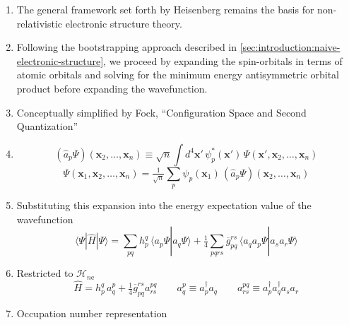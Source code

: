 \begin{enumerate}
    \item
        The general framework set forth by Heisenberg remains the basis for
        non-relativistic electronic structure theory.
    \item
        Following the bootstrapping approach described in
        \cref{sec:introduction:naive-electronic-structure}, we proceed by
        expanding the spin-orbitals in terms of atomic orbitals and solving for
        the minimum energy antisymmetric orbital product before expanding the
        wavefunction.
    \item
        Conceptually simplified by Fock, ``Configuration Space and Second
        Quantization''\cite{Fock:1932p622}
    \item
        \begin{equation}
            (\hat{a}_p\Psi)(\mathbf{x}_2, \ldots, \mathbf{x}_n)
            \equiv
            \sqrt{n}
            \int
            d^4\mathbf{x}'\,
            \psi_p^*(\mathbf{x}')\,
            \Psi(\mathbf{x}', \mathbf{x}_2, \ldots, \mathbf{x}_n)
        \end{equation}
        \begin{equation}
            \Psi(\mathbf{x}_1, \mathbf{x}_2, \ldots, \mathbf{x}_n)
            =
            \tfrac{1}{\sqrt{n}}
            \sum_p
            \psi_p(\mathbf{x}_1)\,
            (\hat{a}_p\Psi)(\mathbf{x}_2, \ldots, \mathbf{x}_n)
        \end{equation}
    \item
        Substituting this expansion into the energy expectation value of the
        wavefunction
        \begin{equation}
            \langle\Psi|\hat{H}|\Psi\rangle
            =
            \sum_{pq}
            h_p^q\,
            \langle a_p\Psi| a_q\Psi\rangle
            +
            \tfrac{1}{4}
            \sum_{pqrs}
            \overline{g}_{pq}^{rs}\,
            \langle a_q a_p\Psi| a_s a_r\Psi\rangle
        \end{equation}
    \item
        Restricted to \(\mathcal{H}_{n\mathrm{e}}\)
        \begin{equation}
            \hat{H}
            =
            h_p^q\,
            a^p_q
            +
            \tfrac{1}{4}
            \overline{g}_{pq}^{rs}
            a^{pq}_{rs}
            \qquad
            a^p_q
            \equiv
            a_p^\dagger a_q
            \qquad
            a^{pq}_{rs}
            \equiv
            a_p^\dagger a_q^\dagger a_s a_r
        \end{equation}
    \item
        Occupation number representation
\end{enumerate}



